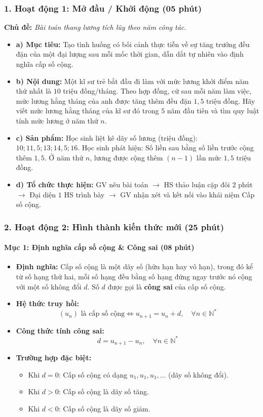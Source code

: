 \documentclass[12pt, a4paper]{article}
\begin{document}
\subsubsection*{1. Hoạt động 1: Mở đầu / Khởi động (05 phút)}
\textbf{Chủ đề:} \textit{Bài toán thang lương tích lũy theo năm công tác.}
\begin{itemize}
    \item \textbf{a) Mục tiêu:} Tạo tình huống có bối cảnh thực tiễn về sự tăng trưởng đều đặn của một đại lượng sau mỗi mốc thời gian, dẫn dắt tự nhiên vào định nghĩa cấp số cộng.
    \item \textbf{b) Nội dung:} Một kĩ sư trẻ bắt đầu đi làm với mức lương khởi điểm năm thứ nhất là $10$ triệu đồng/tháng. Theo hợp đồng, cứ sau mỗi năm làm việc, mức lương hằng tháng của anh được tăng thêm đều đặn $1{,}5$ triệu đồng.
    Hãy viết mức lương hằng tháng của kĩ sư đó trong $5$ năm đầu tiên và tìm quy luật tính mức lương ở năm thứ $n$.
    \item \textbf{c) Sản phẩm:} Học sinh liệt kê dãy số lương (triệu đồng): $10; 11{,}5; 13; 14{,}5; 16$.
    Học sinh phát hiện: Số liền sau bằng số liền trước cộng thêm $1{,}5$. Ở năm thứ $n$, lương được cộng thêm $(n - 1)$ lần mức $1{,}5$ triệu đồng.
    \item \textbf{d) Tổ chức thực hiện:} GV nêu bài toán $\to$ HS thảo luận cặp đôi $2$ phút $\to$ Đại diện $1$ HS trình bày $\to$ GV nhận xét và kết nối vào khái niệm Cấp số cộng.
\end{itemize}


\subsubsection*{2. Hoạt động 2: Hình thành kiến thức mới (25 phút)}


\paragraph{Mục 1: Định nghĩa cấp số cộng & Công sai (08 phút)}
\begin{itemize}
    \item \textbf{Định nghĩa:} Cấp số cộng là một dãy số (hữu hạn hay vô hạn), trong đó kể từ số hạng thứ hai, mỗi số hạng đều bằng số hạng đứng ngay trước nó cộng với một số không đổi $d$.
    Số $d$ được gọi là \textbf{công sai} của cấp số cộng.
    \item \textbf{Hệ thức truy hồi:}
    $$(u_n) \text{ là cấp số cộng} \iff u_{n+1} = u_n + d, \quad \forall n \in \mathbb{N}^*$$
    \item \textbf{Công thức tính công sai:}
    $$d = u_{n+1} - u_n, \quad \forall n \in \mathbb{N}^*$$
    \item \textbf{Trường hợp đặc biệt:}
    \begin{itemize}
        \item Khi $d = 0$: Cấp số cộng có dạng $u_1, u_1, u_1, \dots$ (dãy số không đổi).
        \item Khi $d > 0$: Cấp số cộng là dãy số tăng.
        \item Khi $d < 0$: Cấp số cộng là dãy số giảm.
    \end{itemize}
\end{itemize}
\end{document}
